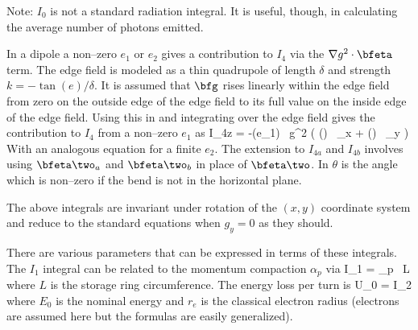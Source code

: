 Note: $I_0$ is not a standard radiation integral. It is useful,
though, in calculating the average number of photons emitted.

In a dipole a non--zero $e_1$ or $e_2$ gives a contribution to $I_4$
via the $\nabla g^2 \cdot \bfeta$ term. The edge field is modeled as a
thin quadrupole of length $\delta$ and strength $k = -\tan(e) /
\delta$. It is assumed that $\bfg$ rises linearly within the edge field
from zero on the outside edge of the edge field to its full value on the inside 
edge of the edge field. 
Using this in  and integrating over the edge field gives the contribution
to $I_4$ from a non--zero $e_1$ as
  \Begineq
    I_{4z} = -\tan(e_1) \, g^2
    \left( \cos(\theta) \, \eta_x + \sin(\theta) \, \eta_y \right)
    \label{iegct}
  \Endeq
With an analogous equation for a finite $e_2$. The extension to
$I_{4a}$ and $I_{4b}$ involves using $\bfeta\two_a$ and $\bfeta\two_b$
in place of $\bfeta\two$.  In  $\theta$ is the 
angle which is non--zero if the bend is not in the horizontal plane.

The above integrals are invariant under rotation of the $(x,y)$ coordinate
system and reduce to the standard equations when $g_y = 0$ as they should.

There are various parameters that can be expressed in terms of these
integrals.  The $I_1$ integral can be related to the momentum
compaction $\alpha_p$ via
  \Begineq
    I_1 = \alpha_p \, L
  \Endeq
where $L$ is the storage ring circumference. The energy loss per turn is
  \Begineq
    U_0 =  I_2
  \Endeq
where $E_0$ is the nominal energy and $r_e$ is the classical electron
radius (electrons are assumed here but the formulas are easily
generalized).

